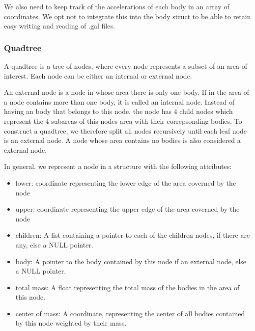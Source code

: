 \documentclass[a4paper]{scrartcl}
\begin{document}
            We also need to keep track of the accelerations of each body in an
            array of coordinates. We opt not to integrate this into the body
            struct to be able to retain easy writing and reading of .gal files.

        \subsubsection{Quadtree}
            A quadtree is a tree of nodes, where every node represents a subset
            of an area of interest. Each node can be either an internal or external node.

            An external node is a node in whose area there is only one body. If
            in the area of a node contains more than one body, it is called an
            internal node. Instead of having an body that belongs to this node,
            the node has 4 child nodes which represent the 4 subareas of this
            nodes area with their correpsonding bodies. To construct a quadtree,
            we therefore split all nodes recursively until each leaf node is an
            external node. A node whose area contains no bodies is also
            considered a external node.

            In general, we represent a node in a structure with the following attributes:
            \begin{itemize}
                \item lower: coordinate representing the lower edge of the area coverned by the node
                \item upper: coordinate representing the upper edge of the area coverned by the node
                \item children: A list containing a pointer to each of the children nodes, if there are any, else a NULL pointer.
                \item body: A pointer to the body contained by this node if an external node, else a NULL pointer.
                \item total mass: A float representing the total mass of the bodies in the area of this node.
                \item center of mass: A coordinate, representing the center of all bodies contained by this node weighted by their mass.
            \end{itemize}
\end{document}

